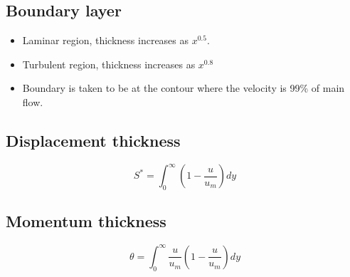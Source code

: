\documentclass[class=report, crop=false, 12pt,a4paper]{standalone}
\begin{document}
\subsection{Boundary layer}
\begin{itemize}
  \item Laminar region, thickness increases as \(x^{0.5}\).
  \item Turbulent region, thickness increases as \( x^{0.8} \)
  \item Boundary is taken to be at the contour where the velocity is 99\% of main flow.
\end{itemize}
\subsection{Displacement thickness}
\[ S^* = \int_0^\infty \left( 1 - \frac{u}{u_m} \right) dy \]
\subsection{Momentum thickness}
\[ \theta = \int_0^\infty \frac{u}{u_m} \left( 1 - \frac{u}{u_m} \right) dy \]
\end{document}
